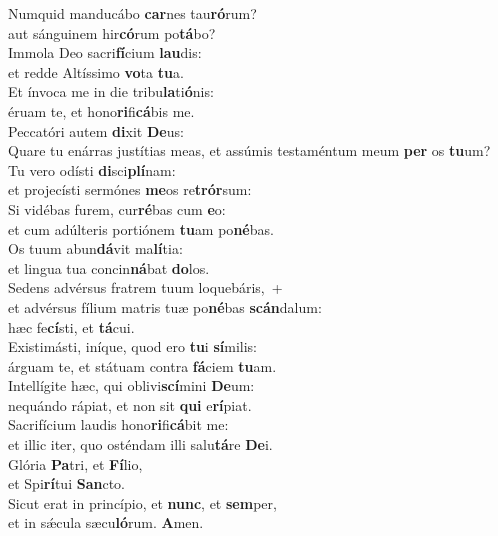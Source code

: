 \evenverse Numquid manducábo \textbf{car}nes tau\textbf{ró}rum?~\*\\
\evenverse aut sánguinem hir\textbf{có}rum po\textbf{tá}bo?\\
\oddverse Immola Deo sacri\textbf{fí}cium \textbf{lau}dis:~\*\\
\oddverse et redde Altíssimo \textbf{vo}ta \textbf{tu}a.\\
\evenverse Et ínvoca me in die tribu\textbf{la}ti\textbf{ó}nis:~\*\\
\evenverse éruam te, et hono\textbf{ri}fi\textbf{cá}bis me.\\
\oddverse Peccatóri autem \textbf{di}xit \textbf{De}us:~\*\\
\oddverse Quare tu enárras justítias meas, et assúmis testaméntum meum \textbf{per} os \textbf{tu}um?\\
\evenverse Tu vero odísti \textbf{di}sci\textbf{plí}nam:~\*\\
\evenverse et projecísti sermónes \textbf{me}os re\textbf{trór}sum:\\
\oddverse Si vidébas furem, cur\textbf{ré}bas cum \textbf{e}o:~\*\\
\oddverse et cum adúlteris portiónem \textbf{tu}am po\textbf{né}bas.\\
\evenverse Os tuum abun\textbf{dá}vit ma\textbf{lí}tia:~\*\\
\evenverse et lingua tua concin\textbf{ná}bat \textbf{do}los.\\
\oddverse Sedens advérsus fratrem tuum loquebáris,~+\\
\oddverse  et advérsus fílium matris tuæ po\textbf{né}bas \textbf{scán}dalum:~\*\\
\oddverse hæc fe\textbf{cí}sti, et \textbf{tá}cui.\\
\evenverse Existimásti, iníque, quod ero \textbf{tu}i \textbf{sí}milis:~\*\\
\evenverse árguam te, et státuam contra \textbf{fá}ciem \textbf{tu}am.\\
\oddverse Intellígite hæc, qui oblivi\textbf{scí}mini \textbf{De}um:~\*\\
\oddverse nequándo rápiat, et non sit \textbf{qui} e\textbf{rí}piat.\\
\evenverse Sacrifícium laudis hono\textbf{ri}fi\textbf{cá}bit me:~\*\\
\evenverse et illic iter, quo osténdam illi salu\textbf{tá}re \textbf{De}i.\\
\oddverse Glória \textbf{Pa}tri, et \textbf{Fí}lio,~\*\\
\oddverse et Spi\textbf{rí}tui \textbf{San}cto.\\
\evenverse Sicut erat in princípio, et \textbf{nunc}, et \textbf{sem}per,~\*\\
\evenverse et in sǽcula sæcu\textbf{ló}rum. \textbf{A}men.\\
